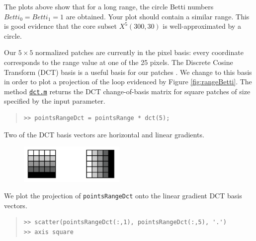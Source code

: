 \documentclass[amscd, amssymb, verbatim]{amsart}[12pt]
\theoremstyle{remark}
\theoremstyle{remark}
\theoremstyle{remark}
\begin{document}
The plots above show that for a long range, the circle Betti numbers $Betti_0 = Betti_1 = 1$ are obtained. Your plot should contain a similar range. This is good evidence that the core subset $X^5(300,30)$ is well-approximated by a circle. 

Our $5\times 5$ normalized patches are currently in the pixel basis: every coordinate corresponds to the range value at one of the 25 pixels. The Discrete Cosine Transform (DCT) basis is a useful basis for our patches \citep{Range, Mumford}. We change to this basis in order to plot a projection of the loop evidenced by Figure \ref{fig:rangeBetti}. The method \href{https://github.com/appliedtopology/javaplex/tree/master/src/matlab/for_distribution/tutorial_examples/dct.m}{\texttt{dct.m}} returns the DCT change-of-basis matrix for square patches of size specified by the input parameter.

\begin{quote} \begin{verbatim} 
>> pointsRangeDct = pointsRange * dct(5);
\end{verbatim} \end{quote}

Two of the DCT basis vectors are horizontal and linear gradients.

\vspace{-3mm}
\begin{figure}[htb]
	\centering
	\includegraphics[width=2in]{linearGrad}
\end{figure}
\vspace{-3mm}
\FloatBarrier

We plot the projection of \texttt{pointsRangeDct} onto the linear gradient DCT basis vectors.

\begin{quote} \begin{verbatim}
>> scatter(pointsRangeDct(:,1), pointsRangeDct(:,5), '.')
>> axis square
\end{verbatim} \end{quote}
\end{document}
